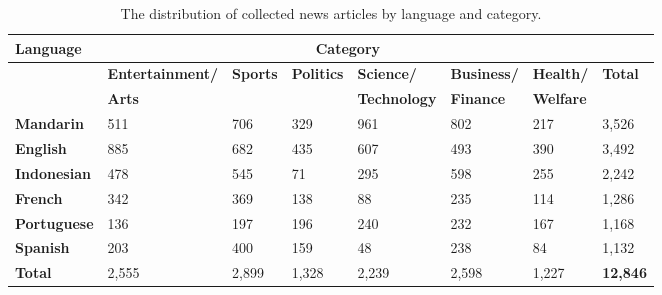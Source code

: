 \documentclass{l4proj}
\begin{document}
\begin{table}[h]
\begin{tabular}{llllllll}
\hline
\textbf{Language}   & \multicolumn{6}{c}{\textbf{Category}}                                                                                       &                 \\ \hline
\textbf{}           & \textbf{Entertainment/} & \textbf{Sports} & \textbf{Politics} & \textbf{Science/}     & \textbf{Business/} & \textbf{Health/}   & \textbf{Total}  \\
\textbf{}           & \textbf{Arts}         & \textbf{}       & \textbf{}         & \textbf{Technology} & \textbf{Finance} & \textbf{Welfare} & \textbf{}       \\ \hline
\textbf{Mandarin}   & 511                    & 706             & 329               & 961                  & 802               & 217               & 3,526           \\
\textbf{English}    & 885                    & 682             & 435               & 607                  & 493               & 390               & 3,492           \\
\textbf{Indonesian} & 478                    & 545             & 71                & 295                  & 598               & 255               & 2,242           \\
\textbf{French}     & 342                    & 369             & 138               & 88                   & 235               & 114               & 1,286           \\
\textbf{Portuguese} & 136                    & 197             & 196               & 240                  & 232               & 167               & 1,168           \\
\textbf{Spanish}    & 203                    & 400             & 159               & 48                   & 238               & 84                & 1,132           \\ \hline
\textbf{Total}      & 2,555                  & 2,899           & 1,328             & 2,239                & 2,598             & 1,227             & \textbf{12,846}
\\ \hline
\end{tabular}
\caption{The distribution of collected news articles by language and category.}
\label{table:collectedstats}
\end{table}
\end{document}
